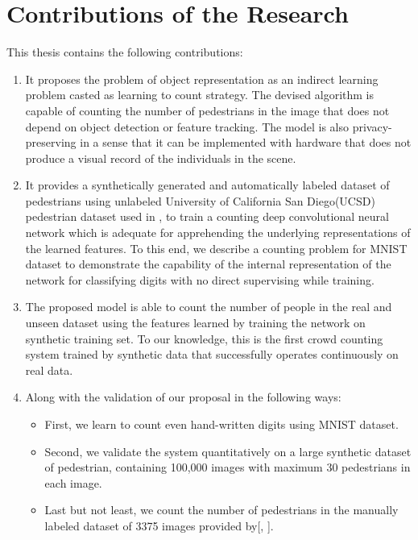 \section{Contributions of the Research}
This thesis contains the following contributions:
\begin{enumerate}
	\item It proposes the problem of object representation as an indirect learning problem casted as learning to count strategy. The devised algorithm is capable of counting the number of pedestrians in the image that does not depend on object detection or feature tracking. The model is also privacy-preserving in a sense that it can be implemented with hardware that does not produce a visual record of the individuals in the scene. 
	\item It provides a synthetically generated and automatically labeled dataset of pedestrians using unlabeled University of California San Diego(UCSD) pedestrian dataset used in \cite{mahadevan2010anomaly}, to train a counting deep convolutional neural network which is adequate for apprehending the underlying representations of the learned features. To this end, we describe a counting problem for MNIST dataset to demonstrate the capability of the internal representation of the network for classifying digits with no direct supervising while training. 
	\item The proposed model is able to count the number of people in the real and unseen dataset using the features learned by training the network on synthetic training set. To our knowledge, this is the first crowd counting system trained by synthetic data that successfully operates continuously on real data. 
	\item Along with the validation of our proposal in the following ways:
	\begin{itemize}
		\item First, we learn to count even hand-written digits using MNIST dataset. 
		\item Second, we validate the system quantitatively on a large synthetic dataset of pedestrian, containing 100,000 images with maximum 30 pedestrians in each image. 
		\item Last but not least, we count the number of pedestrians in the manually labeled dataset of 3375 images provided by[\citeauthor*{chan2013ground}, \citeyear{chan2013ground}]. 
	\end{itemize}
	
\end{enumerate}

